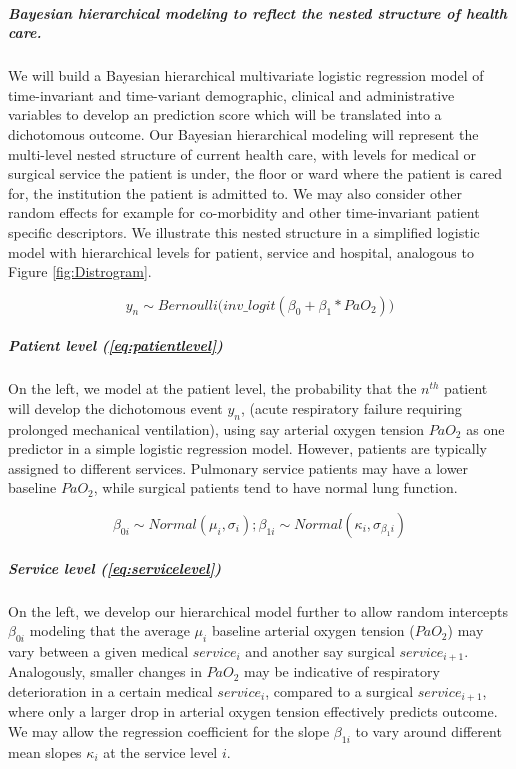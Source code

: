 \documentclass[11pt,notitlepage]{article}
\begin{document}
\subparagraph*{Bayesian hierarchical modeling to reflect the nested structure of health care.}   
We will build a Bayesian hierarchical multivariate logistic regression model of time-invariant and time-variant demographic, clinical and administrative variables to develop an prediction score which will be translated into a dichotomous outcome. Our Bayesian hierarchical modeling will represent the multi-level nested structure of current health care, with levels for medical or surgical service the patient is under, the floor or ward where the patient is cared for, the institution the patient is admitted to. We may also consider other random effects for example for co-morbidity and other time-invariant patient specific descriptors. We illustrate this nested structure in a simplified logistic model with hierarchical levels for patient, service and hospital, analogous to Figure \ref{fig:Distrogram}. 

\begin{figure}
\vspace{-5pt}
 \begin{equation} \label{eq:patientlevel}
 y_{n} \sim Bernoulli \Big(inv\_logit (\beta_{0} +\beta_{1} * PaO_2) \Big)
 \end{equation}
\vspace{-25pt}
\end{figure}

\subparagraph*{Patient level (\ref{eq:patientlevel})}
On the left, we model at the patient level, the probability that the $n^{th}$ patient will develop the dichotomous event $y_n$, (acute respiratory failure requiring prolonged mechanical ventilation), using say arterial oxygen tension $PaO_{2}$ as one predictor in a simple logistic regression model. However, patients are typically assigned to different services. Pulmonary service patients may have a lower baseline $PaO_2$, while surgical patients tend to have normal lung function. 

\begin{figure}
\vspace{-10pt}
\begin{equation} \label{eq:servicelevel}
 \beta_{0i} \sim Normal (\mu_i , \sigma_{i}); \beta_{1i} \sim Normal (\kappa_i, \sigma_{\beta_1i})
\end{equation}
\vspace{-25pt}
\end{figure}

\subparagraph*{Service level (\ref{eq:servicelevel})}
On the left, we develop our hierarchical model further to allow random intercepts $\beta_{0i}$ modeling that the average  $\mu_i$ baseline arterial oxygen tension ($PaO_2$) may vary between a given medical $service_i$ and another say surgical $service_{i+1}$. Analogously, smaller changes in $PaO_2$ may be indicative of respiratory deterioration in a certain medical $service_i$, compared to a surgical $service_{i+1}$, where only a larger drop in arterial oxygen tension effectively predicts outcome. We may allow the regression coefficient for the slope $\beta_{1i}$ to vary around different mean slopes $\kappa_i$ at the service level $i$. 
\end{document}
